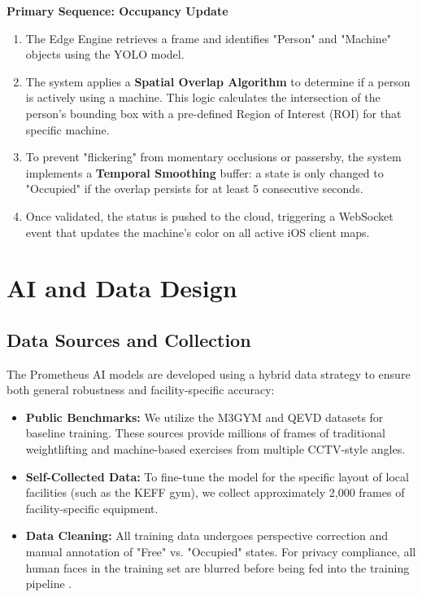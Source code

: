 \textbf{Primary Sequence: Occupancy Update}
\begin{enumerate}
    \item The Edge Engine retrieves a frame and identifies "Person" and "Machine" objects using the YOLO model.
    \item The system applies a \textbf{Spatial Overlap Algorithm} to determine if a person is actively using a machine. This logic calculates the intersection of the person's bounding box with a pre-defined Region of Interest (ROI) for that specific machine.
    \item To prevent "flickering" from momentary occlusions or passersby, the system implements a \textbf{Temporal Smoothing} buffer: a state is only changed to "Occupied" if the overlap persists for at least 5 consecutive seconds.
    \item Once validated, the status is pushed to the cloud, triggering a WebSocket event that updates the machine's color on all active iOS client maps.
\end{enumerate}

\section{AI and Data Design}
\label{section:ai-data-design}

\subsection{Data Sources and Collection}
The Prometheus AI models are developed using a hybrid data strategy to ensure both general robustness and facility-specific accuracy:
\begin{itemize}
    \item \textbf{Public Benchmarks:} We utilize the M3GYM \cite{m3gym:dataset} and QEVD datasets for baseline training. These sources provide millions of frames of traditional weightlifting and machine-based exercises from multiple CCTV-style angles.
    \item \textbf{Self-Collected Data:} To fine-tune the model for the specific layout of local facilities (such as the KEFF gym), we collect approximately 2,000 frames of facility-specific equipment.
    \item \textbf{Data Cleaning:} All training data undergoes perspective correction and manual annotation of "Free" vs. "Occupied" states. For privacy compliance, all human faces in the training set are blurred before being fed into the training pipeline \cite{thailand:pdpa}.
\end{itemize}

